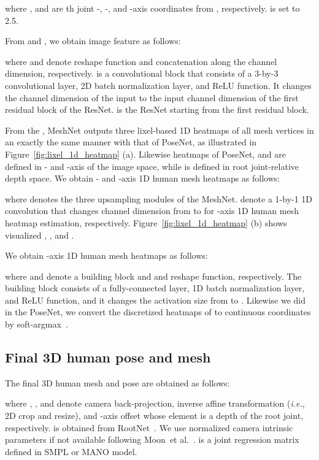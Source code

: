 \documentclass[runningheads]{llncs}
\begin{document}
where ,  and  are th joint -, -, and -axis coordinates from , respectively.
 is set to 2.5.

From  and , we obtain image feature  as follows:

where  and  denote reshape function and concatenation along the channel dimension, respectively.
 is a convolutional block that consists of a 3-by-3 convolutional layer, 2D batch normalization layer, and ReLU function.
It changes the channel dimension of the input to the input channel dimension of the first residual block of the ResNet.
 is the ResNet starting from the first residual block.

From the , MeshNet outputs three lixel-based 1D heatmaps of all mesh vertices  in an exactly the same manner with that of PoseNet, as illustrated in Figure~\ref{fig:lixel_1d_heatmap} (a).
Likewise heatmaps of PoseNet,  and  are defined in - and -axis of the image space, while  is defined in root joint-relative depth space.
We obtain - and -axis 1D human mesh heatmaps as follows:

where  denotes the three upsampling modules of the MeshNet.
 denote a 1-by-1 1D convolution that changes channel dimension from  to  for -axis 1D human mesh heatmap estimation, respectively.
Figure~\ref{fig:lixel_1d_heatmap} (b) shows visualized , , and .

We obtain -axis 1D human mesh heatmaps as follows:

where  and  denote a building block and and reshape function, respectively.
The building block consists of a fully-connected layer, 1D batch normalization layer, and ReLU function, and it changes the activation size from  to .
Likewise we did in the PoseNet, we convert the discretized heatmaps of  to continuous coordinates  by soft-argmax~\cite{sun2018integral}.

\subsection{Final 3D human pose and mesh}
The final 3D human mesh  and pose  are obtained as follows:

\noindent where , , and  denote camera back-projection, inverse affine transformation (\textit{i.e.}, 2D crop and resize), and -axis offset whose element is a depth of the root joint, respectively.
 is obtained from RootNet~\cite{moon2019camera}.
We use normalized camera intrinsic parameters if not available following Moon~et al.~\cite{moon2019camera}.
 is a joint regression matrix defined in SMPL or MANO model.
\end{document}

